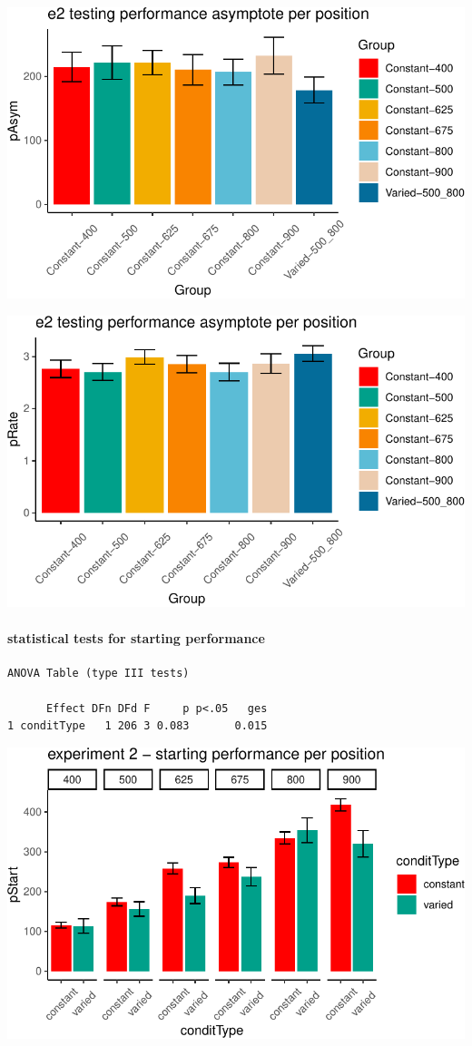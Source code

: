 \documentclass[
  12pt,
  letterpaper,
]{article}
\begin{document}
\includegraphics{full_files/figure-pdf/unnamed-chunk-69-2.pdf}

\includegraphics{full_files/figure-pdf/unnamed-chunk-69-3.pdf}

\paragraph{statistical tests for starting
performance}\label{statistical-tests-for-starting-performance}

\begin{verbatim}
ANOVA Table (type III tests)

      Effect DFn DFd F     p p<.05   ges
1 conditType   1 206 3 0.083       0.015
\end{verbatim}

\includegraphics{full_files/figure-pdf/unnamed-chunk-70-1.pdf}
\end{document}

